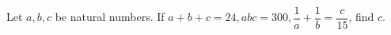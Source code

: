 Let $a, b, c$ be natural numbers. If $a+b+c=24, abc=300, \dfrac{1}{a}+\dfrac{1}{b}=\dfrac{c}{15}$, find $c$.
